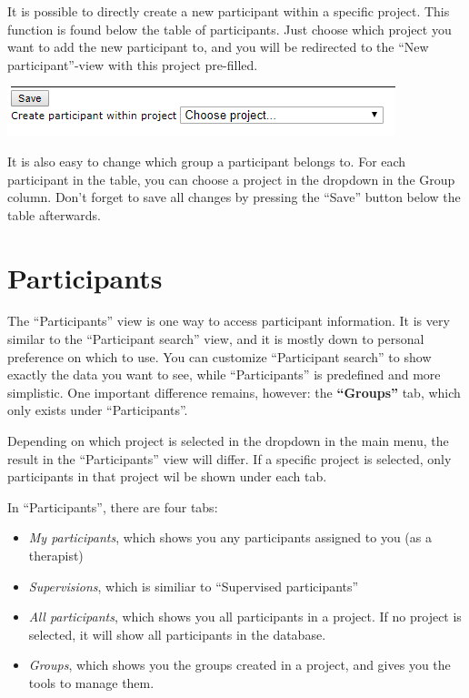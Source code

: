 \documentclass[]{book}
\providecommand{\tightlist}{%
  \setlength{\itemsep}{0pt}\setlength{\parskip}{0pt}}
\begin{document}
It is possible to directly create a new participant within a specific project. This function is found below the table of participants. Just choose which project you want to add the new participant to, and you will be redirected to the ``New participant''-view with this project pre-filled.

\includegraphics{images/add-new-participants.png}

It is also easy to change which group a participant belongs to. For each participant in the table, you can choose a project in the dropdown in the Group column. Don't forget to save all changes by pressing the ``Save'' button below the table afterwards.

\hypertarget{participants}{%
\chapter{Participants}\label{participants}}

The ``Participants'' view is one way to access participant information. It is very similar to the ``Participant search'' view, and it is mostly down to personal preference on which to use. You can customize ``Participant search'' to show exactly the data you want to see, while ``Participants'' is predefined and more simplistic. One important difference remains, however: the \textbf{``Groups''} tab, which only exists under ``Participants''.

Depending on which project is selected in the dropdown in the main menu, the result in the ``Participants'' view will differ. If a specific project is selected, only participants in that project wil be shown under each tab.

In ``Participants'', there are four tabs:

\begin{itemize}
\tightlist
\item
  \emph{My participants}, which shows you any participants assigned to you (as a therapist)
\item
  \emph{Supervisions}, which is similiar to ``Supervised participants''
\item
  \emph{All participants}, which shows you all participants in a project. If no project is selected, it will show all participants in the database.
\item
  \emph{Groups}, which shows you the groups created in a project, and gives you the tools to manage them.
\end{itemize}
\end{document}
